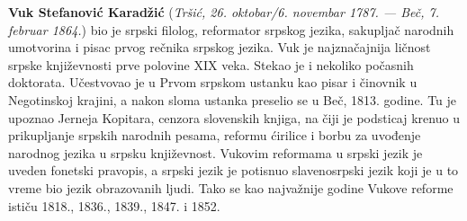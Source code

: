 \documentclass[a4paper,12pt,oneside]{memoir}
\begin{document}
\pangrami

\literatura

\backmatter

\begin{biografija}
  \textbf{Vuk Stefanović Karadžić} (\emph{Tršić,
    26. oktobar/6. novembar 1787. — Beč, 7. februar 1864.}) bio je
  srpski filolog, reformator srpskog jezika, sakupljač narodnih
  umotvorina i pisac prvog rečnika srpskog jezika.  Vuk je
  najznačajnija ličnost srpske književnosti prve polovine XIX
  veka. Stekao je i nekoliko počasnih doktorata.  Učestvovao je u
  Prvom srpskom ustanku kao pisar i činovnik u Negotinskoj krajini, a
  nakon sloma ustanka preselio se u Beč, 1813. godine. Tu je upoznao
  Jerneja Kopitara, cenzora slovenskih knjiga, na čiji je podsticaj
  krenuo u prikupljanje srpskih narodnih pesama, reformu ćirilice i
  borbu za uvođenje narodnog jezika u srpsku književnost. Vukovim
  reformama u srpski jezik je uveden fonetski pravopis, a srpski jezik
  je potisnuo slavenosrpski jezik koji je u to vreme bio jezik
  obrazovanih ljudi. Tako se kao najvažnije godine Vukove reforme
  ističu 1818., 1836., 1839., 1847. i 1852.
\end{biografija}





\end{document}
